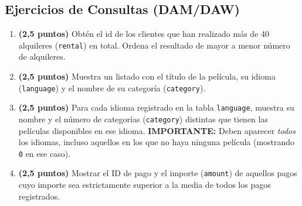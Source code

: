 \documentclass[a4paper,11pt]{article}
\begin{document}
\begin{Form}
\section{Ejercicios de Consultas (DAM/DAW)}

\begin{enumerate}[leftmargin=*, label=\textbf{Consulta \arabic*:}]
    \item \textbf{(2,5 puntos)} %
    Obtén el id de los clientes que han realizado más de 40 alquileres (\texttt{rental}) en total. Ordena el resultado de mayor a menor número de alquileres.

    \item \textbf{(2,5 puntos)} %
    Muestra un listado con el título de la película, su idioma (\texttt{language}) y el nombre de su categoría (\texttt{category}). 

    \item \textbf{(2,5 puntos)} %
    Para cada idioma registrado en la tabla \texttt{language}, muestra su nombre y el número de categorías (\texttt{category}) distintas que tienen las películas disponibles en ese idioma. \textbf{IMPORTANTE:} Deben aparecer \emph{todos} los idiomas, incluso aquellos en los que no haya ninguna película (mostrando \texttt{0} en ese caso).

    \item \textbf{(2,5 puntos)} %
    Mostrar el ID de pago y el importe (\texttt{amount}) de aquellos pagos cuyo importe sea estrictamente superior a la media de todos los pagos registrados.
\end{enumerate}

\end{Form}
\end{document}
